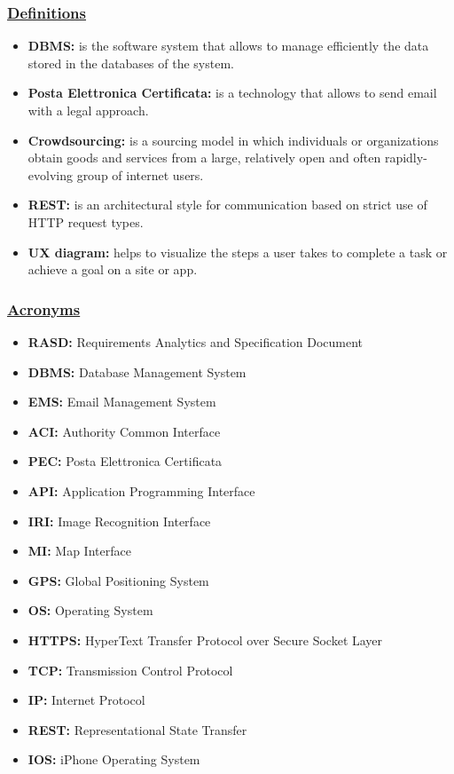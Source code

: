 		\subsubsection[Definitions]{\hyperlink{toc}{Definitions}}
			\begin{itemize}
				\item \textbf{DBMS:} is the software system that allows to manage efficiently the data stored in the databases of the system.
				
				\item \textbf{Posta Elettronica Certificata:} is a technology that allows to send email with a legal approach.
				
				\item \textbf{Crowdsourcing:} is a sourcing model in which individuals or organizations obtain goods and services from a large, relatively open and often rapidly-evolving group of internet users.
				
				\item \textbf{REST:} is an architectural style for communication based on strict use of HTTP request types.
				
				\item \textbf{UX diagram:} helps to visualize the steps a user takes to complete a task or achieve a goal on a site or app.
			\end{itemize}
		
		\subsubsection[Acronyms]{\hyperlink{toc}{Acronyms}}
			\begin{itemize}
				\item \textbf{RASD:} Requirements Analytics and Specification Document
				\item \textbf{DBMS:} Database Management System
				\item \textbf{EMS:} Email Management System
				\item \textbf{ACI:} Authority Common Interface
				\item \textbf{PEC:} Posta Elettronica Certificata
				\item \textbf{API:} Application Programming Interface
				\item \textbf{IRI:} Image Recognition Interface
				\item \textbf{MI:} Map Interface
				\item \textbf{GPS:} Global Positioning System
				\item \textbf{OS:} Operating System
				\item \textbf{HTTPS:} HyperText Transfer Protocol over Secure Socket Layer
				\item \textbf{TCP:} Transmission Control Protocol
				\item \textbf{IP:} Internet Protocol
				\item \textbf{REST:} Representational State Transfer
				\item \textbf{IOS:} iPhone Operating System	
			\end{itemize}
			
